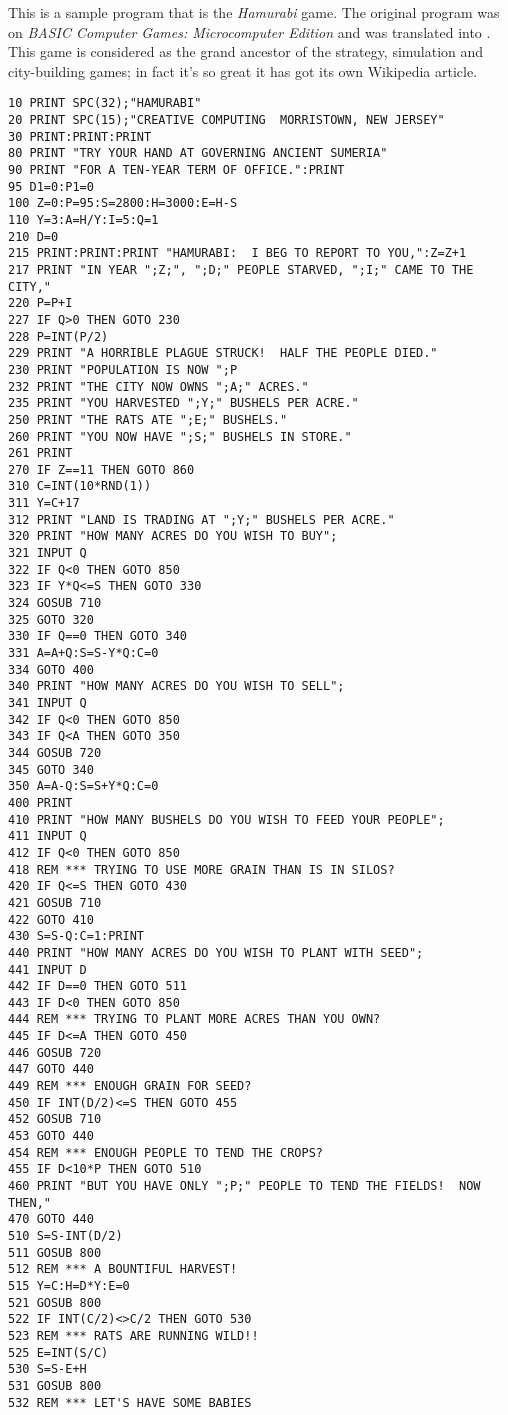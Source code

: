 This is a sample program that is the \emph{Hamurabi} game. The original program was on \emph{BASIC Computer Games: Microcomputer Edition} and was translated into \tbas. This game is considered as the grand ancestor of the strategy, simulation and city-building games; in fact it's so great it has got its own Wikipedia article.

\begin{lstlisting}
10 PRINT SPC(32);"HAMURABI"
20 PRINT SPC(15);"CREATIVE COMPUTING  MORRISTOWN, NEW JERSEY"
30 PRINT:PRINT:PRINT
80 PRINT "TRY YOUR HAND AT GOVERNING ANCIENT SUMERIA"
90 PRINT "FOR A TEN-YEAR TERM OF OFFICE.":PRINT
95 D1=0:P1=0
100 Z=0:P=95:S=2800:H=3000:E=H-S
110 Y=3:A=H/Y:I=5:Q=1
210 D=0
215 PRINT:PRINT:PRINT "HAMURABI:  I BEG TO REPORT TO YOU,":Z=Z+1
217 PRINT "IN YEAR ";Z;", ";D;" PEOPLE STARVED, ";I;" CAME TO THE CITY,"
220 P=P+I
227 IF Q>0 THEN GOTO 230
228 P=INT(P/2)
229 PRINT "A HORRIBLE PLAGUE STRUCK!  HALF THE PEOPLE DIED."
230 PRINT "POPULATION IS NOW ";P
232 PRINT "THE CITY NOW OWNS ";A;" ACRES."
235 PRINT "YOU HARVESTED ";Y;" BUSHELS PER ACRE."
250 PRINT "THE RATS ATE ";E;" BUSHELS."
260 PRINT "YOU NOW HAVE ";S;" BUSHELS IN STORE."
261 PRINT
270 IF Z==11 THEN GOTO 860
310 C=INT(10*RND(1))
311 Y=C+17
312 PRINT "LAND IS TRADING AT ";Y;" BUSHELS PER ACRE."
320 PRINT "HOW MANY ACRES DO YOU WISH TO BUY";
321 INPUT Q
322 IF Q<0 THEN GOTO 850
323 IF Y*Q<=S THEN GOTO 330
324 GOSUB 710
325 GOTO 320
330 IF Q==0 THEN GOTO 340
331 A=A+Q:S=S-Y*Q:C=0
334 GOTO 400
340 PRINT "HOW MANY ACRES DO YOU WISH TO SELL";
341 INPUT Q
342 IF Q<0 THEN GOTO 850
343 IF Q<A THEN GOTO 350
344 GOSUB 720
345 GOTO 340
350 A=A-Q:S=S+Y*Q:C=0
400 PRINT
410 PRINT "HOW MANY BUSHELS DO YOU WISH TO FEED YOUR PEOPLE";
411 INPUT Q
412 IF Q<0 THEN GOTO 850
418 REM *** TRYING TO USE MORE GRAIN THAN IS IN SILOS?
420 IF Q<=S THEN GOTO 430
421 GOSUB 710
422 GOTO 410
430 S=S-Q:C=1:PRINT
440 PRINT "HOW MANY ACRES DO YOU WISH TO PLANT WITH SEED";
441 INPUT D
442 IF D==0 THEN GOTO 511
443 IF D<0 THEN GOTO 850
444 REM *** TRYING TO PLANT MORE ACRES THAN YOU OWN?
445 IF D<=A THEN GOTO 450
446 GOSUB 720
447 GOTO 440
449 REM *** ENOUGH GRAIN FOR SEED?
450 IF INT(D/2)<=S THEN GOTO 455
452 GOSUB 710
453 GOTO 440
454 REM *** ENOUGH PEOPLE TO TEND THE CROPS?
455 IF D<10*P THEN GOTO 510
460 PRINT "BUT YOU HAVE ONLY ";P;" PEOPLE TO TEND THE FIELDS!  NOW THEN,"
470 GOTO 440
510 S=S-INT(D/2)
511 GOSUB 800
512 REM *** A BOUNTIFUL HARVEST!
515 Y=C:H=D*Y:E=0
521 GOSUB 800
522 IF INT(C/2)<>C/2 THEN GOTO 530
523 REM *** RATS ARE RUNNING WILD!!
525 E=INT(S/C)
530 S=S-E+H
531 GOSUB 800
532 REM *** LET'S HAVE SOME BABIES

\end{lstlisting}
